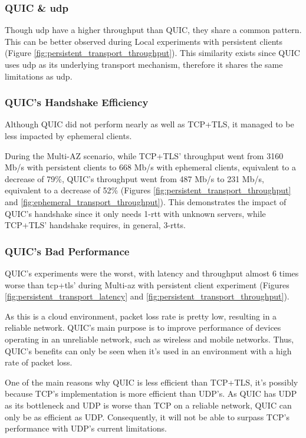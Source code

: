 \subsubsection*{QUIC \& \gls{udp}}

Though \gls{udp} have a higher throughput than QUIC, they share a common pattern. This can be better observed during Local experiments with persistent clients (Figure \ref{fig:persistent_transport_throughput}). This similarity exists since QUIC uses \gls{udp} as its underlying transport mechanism, therefore it shares the same limitations as \gls{udp}.

\subsubsection*{QUIC's Handshake Efficiency}

Although QUIC did not perform nearly as well as TCP+TLS, it managed to be less impacted by ephemeral clients.

During the Multi-AZ scenario, while TCP+TLS’ throughput went from 3160 Mb/s with persistent clients to 668 Mb/s with ephemeral clients, equivalent to a decrease of 79\%, QUIC’s throughput went from 487 Mb/s to 231 Mb/s, equivalent to a decrease of 52\% (Figures \ref{fig:persistent_transport_throughput} and \ref{fig:ephemeral_transport_throughput}). This demonstrates the impact of QUIC’s handshake since it only needs 1-\gls{rtt} with unknown servers, while TCP+TLS’ handshake requires, in general, 3-\gls{rtt}s.

\subsubsection*{QUIC's Bad Performance}

QUIC’s experiments were the worst, with latency and throughput almost 6 times worse than \gls{tcp}+\gls{tls}’ during Multi-\gls{az} with persistent client experiment (Figures \ref{fig:persistent_transport_latency} and \ref{fig:persistent_transport_throughput}).

As this is a cloud environment, packet loss rate is pretty low, resulting in a reliable network. QUIC’s main purpose is to improve performance of devices operating in an unreliable network, such as wireless and mobile networks. Thus, QUIC’s benefits can only be seen when it’s used in an environment with a high rate of packet loss.

One of the main reasons why QUIC is less efficient than TCP+TLS, it’s possibly because TCP’s implementation is more efficient than UDP’s. As QUIC has UDP as its bottleneck and UDP is worse than TCP on a reliable network, QUIC can only be as efficient as UDP. Consequently, it will not be able to surpass TCP’s performance with UDP’s current limitations.

